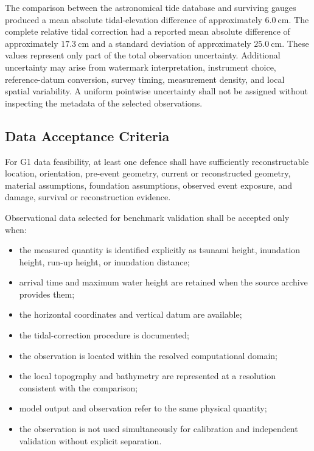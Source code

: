 The comparison between the astronomical tide database and surviving gauges produced a mean absolute tidal-elevation difference of approximately $6.0~\mathrm{cm}$. The complete relative tidal correction had a reported mean absolute difference of approximately $17.3~\mathrm{cm}$ and a standard deviation of approximately $25.0~\mathrm{cm}$. These values represent only part of the total observation uncertainty. Additional uncertainty may arise from watermark interpretation, instrument choice, reference-datum conversion, survey timing, measurement density, and local spatial variability. A uniform pointwise uncertainty shall not be assigned without inspecting the metadata of the selected observations.

\subsection{Data Acceptance Criteria}
\label{sec:res-dat-obs-data-acceptance-criteria}

For G1 data feasibility, at least one defence shall have sufficiently
reconstructable location, orientation, pre-event geometry, current or
reconstructed geometry, material assumptions, foundation assumptions, observed
event exposure, and damage, survival or reconstruction evidence.

Observational data selected for benchmark validation shall be accepted only when:
\begin{itemize}
  \item the measured quantity is identified explicitly as tsunami height, inundation height, run-up height, or inundation distance;
  \item arrival time and maximum water height are retained when the
    source archive provides them;
  \item the horizontal coordinates and vertical datum are available;
  \item the tidal-correction procedure is documented;
  \item the observation is located within the resolved computational domain;
  \item the local topography and bathymetry are represented at a resolution consistent with the comparison;
  \item model output and observation refer to the same physical quantity;
  \item the observation is not used simultaneously for calibration and independent validation without explicit separation.
\end{itemize}

